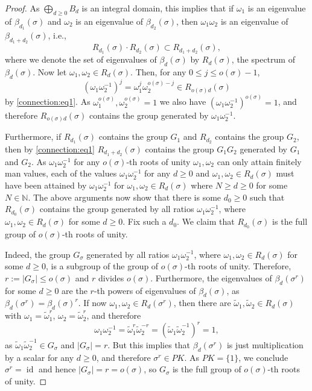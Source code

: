 \documentclass[a4paper]{amsart}
\def\N{{\mathbb{N}}}
\DeclareMathOperator{\id}{\mathrm{id}}
\newcommand{\abs}[1]{\left| #1\right|}
\begin{document}
\begin{proof}
	As $\bigoplus_{d\geq0}B_d$ is an integral domain,
	this implies that if $\omega_1$ is an eigenvalue of $\beta_{d_1}(\sigma)$ and $\omega_2$ is an eigenvalue of $\beta_{d_2}(\sigma)$, then $\omega_1\omega_2$ is an eigenvalue of $\beta_{d_1+d_2}(\sigma)$, i.e.,
	\begin{equation}\label{connection:eq1}
		R_{d_1}(\sigma)\cdot R_{d_2}(\sigma)\subset R_{d_1+d_2}(\sigma),
	\end{equation}
	where we denote the set of eigenvalues of $\beta_d(\sigma)$ by $R_d(\sigma)$, the spectrum of $\beta_d(\sigma)$.
	Now let $\omega_1,\omega_2\in R_d(\sigma)$.
	Then, for any $0\leq j\leq o(\sigma)-1$,
	\begin{displaymath}
		(\omega_1\omega_2^{-1})^j=
		\omega_1^j\omega_2^{o(\sigma)-j}\in R_{o(\sigma)d}(\sigma)
	\end{displaymath}
	by \cref{connection:eq1}.
	As $\omega_1^{o(\sigma)},\omega_2^{o(\sigma)}=1$ we also have $(\omega_1\omega_2^{-1})^{o(\sigma)}=1$,
	and therefore $R_{o(\sigma)d}(\sigma)$ contains the group generated by $\omega_1\omega_2^{-1}$.
	
	Furthermore, if $R_{d_1}(\sigma)$ contains the group $G_1$ and $R_{d_2}$ contains the group $G_2$,
	then by \cref{connection:eq1} $R_{d_1+d_2}(\sigma)$ contains the group $G_1G_2$ generated by $G_1$ and $G_2$.
	As $\omega_1\omega_2^{-1}$ for any $o(\sigma)$-th roots of unity $\omega_1,\omega_2$ can only attain finitely man values,
	each of the values $\omega_1\omega_2^{-1}$ for any $d\geq 0$ and $\omega_1,\omega_2\in R_d(\sigma)$ must have been attained by $\omega_1\omega_2^{-1}$ for $\omega_1,\omega_2\in R_d(\sigma)$ where $N\geq d\geq 0$ for some $N\in\N$.
	The above arguments now show that there is some $d_0\geq0$ such that $R_{d_0}(\sigma)$ contains the group generated by all ratios $\omega_1\omega_2^{-1}$,
	where $\omega_1,\omega_2\in R_d(\sigma)$ for some $d\geq 0$.
	Fix such a $d_0$.
	We claim that $R_{d_0}(\sigma)$ is the full group of $o(\sigma)$-th roots of unity.
	
	Indeed, the group $G_\sigma$ generated by all ratios $\omega_1\omega_2^{-1}$,
	where $\omega_1,\omega_2\in R_d(\sigma)$ for some $d\geq 0$,
	is a subgroup of the group of $o(\sigma)$-th roots of unity.
	Therefore, $r:=\abs{G_\sigma}\leq o(\sigma)$ and $r$ divides $o(\sigma)$.
	Furthermore, the eigenvalues of $\beta_d(\sigma^r)$ for some $d\geq 0$ are the $r$-th powers of eigenvalues of $\beta_d(\sigma)$,
	as $\beta_d(\sigma^r)=\beta_d(\sigma)^r$.
	If now $\omega_1,\omega_2\in R_{d}(\sigma^r)$,
	then there are $\tilde\omega_1,\tilde\omega_2\in R_d(\sigma)$ with $\omega_1=\tilde\omega_1^r$, $\omega_2=\tilde\omega_2^r$,
	and therefore
	\begin{displaymath}
		\omega_1\omega_2^{-1}=
		\tilde\omega_1^r\tilde\omega_2^{-r}=
		(\tilde\omega_1\tilde\omega_2^{-1})^r=1,
	\end{displaymath}
	as $\tilde\omega_1\tilde\omega_2^{-1}\in G_\sigma$ and $\abs{G_\sigma}=r$.
	But this implies that $\beta_d(\sigma^r)$ is just multiplication by a scalar for any $d\geq 0$, and therefore $\sigma^r\in PK$.
	As $PK=\{1\}$, we conclude $\sigma^r=\id$ and hence $\abs{G_\sigma}=r=o(\sigma)$,
	so $G_\sigma$ is the full group of $o(\sigma)$-th roots of unity.


\end{proof}
\end{document}
